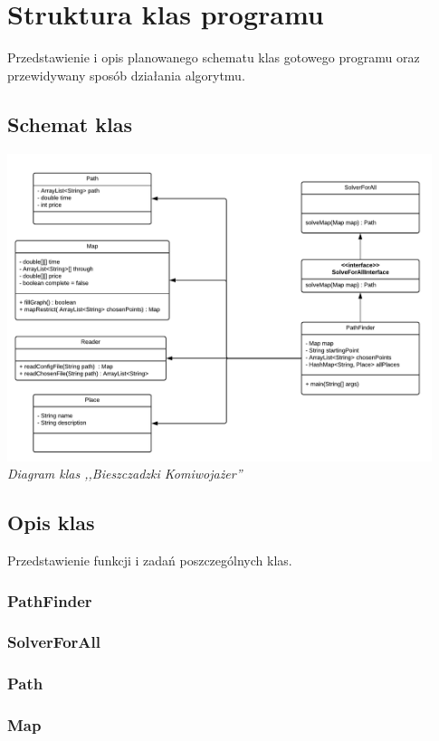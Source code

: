 \documentclass{article}
\begin{document}
\section{Struktura klas programu}
Przedstawienie i opis planowanego schematu klas gotowego programu oraz przewidywany sposób działania algorytmu.

\subsection{Schemat klas}
\includegraphics [height=9cm]{diagram_klas.pdf}
\textit{Diagram klas ,,Bieszczadzki Komiwojażer''}
\subsection{Opis klas}
Przedstawienie funkcji i zadań poszczególnych klas.
\subsubsection{PathFinder}

\subsubsection{SolverForAll}

\subsubsection{Path}

\subsubsection{Map}
\end{document}
